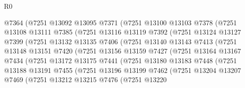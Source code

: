 \begin{lexlean}{R0}
\begin{coremodule}
                @7364
                (@7251
                  @13092
                  @13095
                  @7371
                  (@7251
                    @13100
                    @13103
                    @7378
                    (@7251
                      @13108
                      @13111
                      @7385
                      (@7251
                        @13116
                        @13119
                        @7392
                        (@7251
                          @13124
                          @13127
                          @7399
                          (@7251
                            @13132
                            @13135
                            @7406
                            (@7251
                              @13140
                              @13143
                              @7413
                              (@7251
                                @13148
                                @13151
                                @7420
                                (@7251
                                  @13156
                                  @13159
                                  @7427
                                  (@7251
                                    @13164
                                    @13167
                                    @7434
                                    (@7251
                                      @13172
                                      @13175
                                      @7441
                                      (@7251
                                        @13180
                                        @13183
                                        @7448
                                        (@7251
                                          @13188
                                          @13191
                                          @7455
                                          (@7251
                                            @13196
                                            @13199
                                            @7462
                                            (@7251
                                              @13204
                                              @13207
                                              @7469
                                              (@7251
                                                @13212
                                                @13215
                                                @7476
                                                (@7251
                                                  @13220

\end{coremodule}
\end{lexlean}
